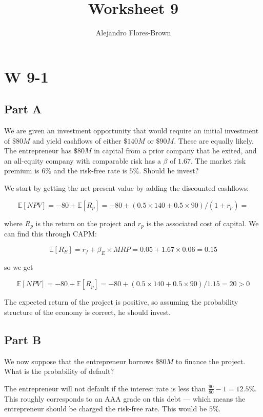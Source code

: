\documentclass[12pt, letterpaper, parskip = full]{article}
\title{Worksheet 9}
\author{Alejandro Flores-Brown}
\newcommand{\Ex}[1]{\mathbb{E}\left[#1\right]}
\begin{document}
	\maketitle

    \section{W 9-1}

    \subsection{Part A}

    We are given an investment opportunity that would require an initial investment of \(\$80M\) and yield cashflows of either \(\$140M\) or \(\$90M\). These are equally likely. The entrepreneur has \(\$80M\) in capital from a prior company that he exited, and an all-equity company with comparable risk has a \(\beta\) of \(1.67\). The market risk premium is \(6\%\) and the risk-free rate is \(5\%\). Should he invest?

    We start by getting the net present value by adding the discounted cashflows:

    \[ \Ex{NPV} = -80 + \Ex{R_p} = -80 + (0.5 \times 140 + 0.5 \times 90)/(1+r_p) =  \]

    where \(R_p\) is the return on the project and \(r_p\) is the associated cost of capital. We can find this through CAPM:

    \[ \Ex{R_E} = r_f + \beta_{E} \times MRP = 0.05 + 1.67 \times 0.06 = 0.15    \]

    so we get 

    \[  \Ex{NPV} = -80 + \Ex{R_p} = -80 + (0.5 \times 140 + 0.5 \times 90)/1.15 = \boxed{20 > 0}\]

    The expected return of the project is positive, so assuming the probability structure of the economy is correct, he should invest.

    \subsection{Part B}

    We now suppose that the entrepreneur borrows \(\$80M\) to finance the project. What is the probability of default?

    The entrepreneur will not default if the interest rate is less than \(\frac{90}{80} - 1 = 12.5\%\). This roughly corresponds to an AAA grade on this debt --- which means the entrepreneur should be charged the risk-free rate. This would be \(5\%\).
\end{document}
